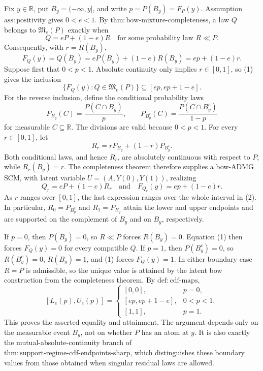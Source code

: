 Fix \(y\in\mathbb R\), put \(B_y=(-\infty,y]\), and write \(p=P(B_y)=F_P(y)\).  Assumption \(\mathrm{ass:positivity}\) gives \(0<e<1\).  By \(\mathrm{thm:bow\text{-}mixture\text{-}completeness}\), a law \(Q\) belongs to \(\mathfrak M_e(P)\) exactly when
\[
 Q=eP+(1-e)R
 \quad\text{for some probability law }R\ll P.
\]
Consequently, with \(r=R(B_y)\),
\[
 F_Q(y)=Q(B_y)=eP(B_y)+(1-e)R(B_y)=ep+(1-e)r. \tag{1}
\]
Suppose first that \(0<p<1\).  Absolute continuity only implies \(r\in[0,1]\), so (1) gives the inclusion
\[
 \{F_Q(y):Q\in\mathfrak M_e(P)\}\subseteq[ep,ep+1-e]. \tag{2}
\]
For the reverse inclusion, define the conditional probability laws
\[
 P_{B_y}(C)=\frac{P(C\cap B_y)}{p},
 \qquad
 P_{B_y^c}(C)=\frac{P(C\cap B_y^c)}{1-p}
\]
for measurable \(C\subseteq\mathbb R\).  The divisions are valid because \(0<p<1\).  For every \(r\in[0,1]\), let
\[
 R_r=rP_{B_y}+(1-r)P_{B_y^c}.
\]
Both conditional laws, and hence \(R_r\), are absolutely continuous with respect to \(P\), while \(R_r(B_y)=r\).  The completeness theorem therefore supplies a bow-ADMG SCM, with latent variable \(U=(A,Y(0),Y(1))\), realizing
\[
 Q_r=eP+(1-e)R_r
 \quad\text{and}
 \quad F_{Q_r}(y)=ep+(1-e)r.
\]
As \(r\) ranges over \([0,1]\), the last expression ranges over the whole interval in (2).  In particular, \(R_0=P_{B_y^c}\) and \(R_1=P_{B_y}\) attain the lower and upper endpoints and are supported on the complement of \(B_y\) and on \(B_y\), respectively.

If \(p=0\), then \(P(B_y)=0\), so \(R\ll P\) forces \(R(B_y)=0\).  Equation (1) then forces \(F_Q(y)=0\) for every compatible \(Q\).  If \(p=1\), then \(P(B_y^c)=0\), so \(R(B_y^c)=0\), \(R(B_y)=1\), and (1) forces \(F_Q(y)=1\).  In either boundary case \(R=P\) is admissible, so the unique value is attained by the latent bow construction from the completeness theorem.  By \(\mathrm{def:cdf\text{-}maps}\),
\[
 [L_e(p),U_e(p)]
 =
 \begin{cases}
 [0,0],&p=0,\\
 [ep,ep+1-e],&0<p<1,\\
 [1,1],&p=1.
 \end{cases}
\]
This proves the asserted equality and attainment.  The argument depends only on the measurable event \(B_y\), not on whether \(P\) has an atom at \(y\).  It is also exactly the mutual-absolute-continuity branch of \(\mathrm{thm:support\text{-}regime\text{-}cdf\text{-}endpoints\text{-}sharp}\), which distinguishes these boundary values from those obtained when singular residual laws are allowed.